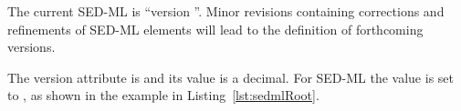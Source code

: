 \subsubsection{}
\label{sec:version}
The current SED-ML  is ``version \version''. Minor revisions containing corrections and refinements of SED-ML elements will lead to the definition of forthcoming versions.

The version attribute is  and its value is a  decimal. For SED-ML \LoneVone the value is set to , as shown in the example in Listing~\ref{lst:sedmlRoot}.

